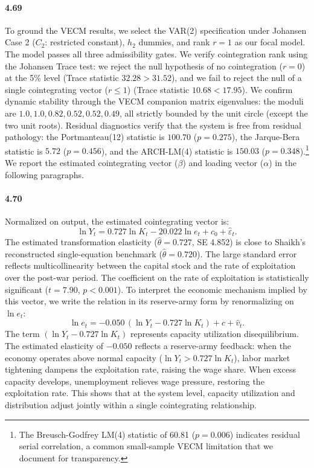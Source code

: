 \paragraph{4.69}
To ground the VECM results, we select the VAR(2) specification under Johansen Case 2 ($C_2$: restricted constant), $h_2$ dummies, and rank $r=1$ as our focal model. The model passes all three admissibility gates. We verify cointegration rank using the Johansen Trace test: we reject the null hypothesis of no cointegration ($r=0$) at the 5\% level (Trace statistic $32.28 > 31.52$), and we fail to reject the null of a single cointegrating vector ($r \leq 1$) (Trace statistic $10.68 < 17.95$). We confirm dynamic stability through the VECM companion matrix eigenvalues: the moduli are $1.0, 1.0, 0.82, 0.52, 0.52, 0.49$, all strictly bounded by the unit circle (except the two unit roots). Residual diagnostics verify that the system is free from residual pathology: the Portmanteau(12) statistic is $100.70$ ($p=0.275$), the Jarque-Bera statistic is $5.72$ ($p=0.456$), and the ARCH-LM(4) statistic is $150.03$ ($p=0.348$).\footnote{The Breusch-Godfrey LM(4) statistic of 60.81 ($p=0.006$) indicates residual serial correlation, a common small-sample VECM limitation that we document for transparency.} We report the estimated cointegrating vector ($\beta$) and loading vector ($\alpha$) in the following paragraphs.

\paragraph{4.70}
Normalized on output, the estimated cointegrating vector is:
\begin{equation}
\ln Y_t = 0.727 \ln K_t - 20.022 \ln e_t + c_0 + \hat{\varepsilon}_t.
\label{eq:s2_cointegrating_vector}
\end{equation}
The estimated transformation elasticity ($\hat{\theta} = 0.727$, SE 4.852) is close to Shaikh's reconstructed single-equation benchmark ($\hat{\theta} = 0.720$). The large standard error reflects multicollinearity between the capital stock and the rate of exploitation over the post-war period. The coefficient on the rate of exploitation is statistically significant ($t = 7.90$, $p < 0.001$). To interpret the economic mechanism implied by this vector, we write the relation in its reserve-army form by renormalizing on $\ln e_t$:
\begin{equation}
\label{eq:focal_vecm_reserve_army}
\ln e_t = -0.050 \, \left(\ln Y_t - 0.727 \ln K_t\right) + c + \hat{v}_t.
\end{equation}
The term $(\ln Y_t - 0.727 \ln K_t)$ represents capacity utilization disequilibrium. The estimated elasticity of $-0.050$ reflects a reserve-army feedback: when the economy operates above normal capacity ($\ln Y_t > 0.727 \ln K_t$), labor market tightening dampens the exploitation rate, raising the wage share. When excess capacity develops, unemployment relieves wage pressure, restoring the exploitation rate. This shows that at the system level, capacity utilization and distribution adjust jointly within a single cointegrating relationship.

